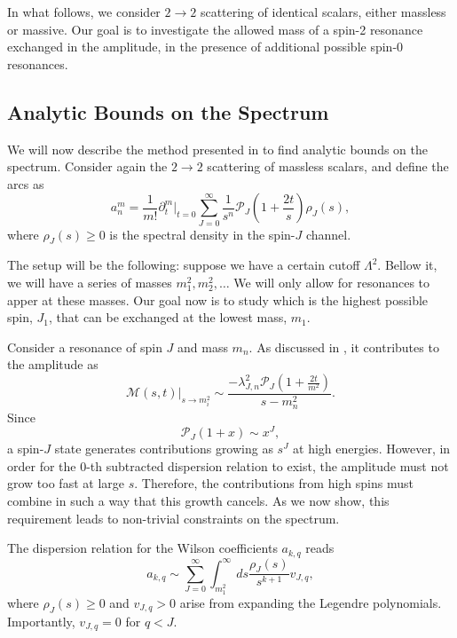 In what follows, we consider $2 \to 2$ scattering of identical scalars, either massless or massive. 
Our goal is to investigate the allowed mass of a spin-2 resonance exchanged in the amplitude, in the presence of additional possible spin-0 resonances. 

\subsection{Analytic Bounds on the Spectrum}

We will now describe the method presented in \autocite{Berman:2024kdh} to find analytic bounds on the spectrum. Consider again the $2 \to 2$ scattering of massless scalars, and define the arcs as 
\begin{equation}
    a_n^m = \frac{1}{m!} \partial_t^m \Big|_{t = 0} 
    \sum_{J=0}^{\infty} \frac{1}{s^n} 
    \mathcal{P}_J \left( 1 + \frac{2t}{s} \right) 
    \rho_J(s),
\end{equation}
where $\rho_J(s) \geq 0$ is the spectral density in the spin-$J$ channel. 

The setup will be the following: suppose we have a certain cutoff $\Lambda^2$. Bellow it, we will have a series of masses $m_1^2, m_2^2, \ldots$ We will only allow for resonances to apper at these masses. Our goal now is to study which is the highest possible spin, $J_1$, that can be exchanged at the lowest mass, $m_1$. 

Consider a resonance of spin $J$ and mass $m_n$. As discussed in , it contributes to the amplitude as 
\begin{equation}
     \mathcal{M}(s, t)|_{s \to m_i^2} \sim  
    \frac{ -  \lambda_{J,n}^2\mathcal{P}_J \left( 1 + \frac{2t}{m^2} \right)}{s - m_n^2} 
    .
\end{equation}
Since 
\begin{equation}
    \mathcal{P}_J(1 + x) \sim x^J,
\end{equation}
a spin-$J$ state generates contributions growing as $s^J$ at high energies. 
However, in order for the $0$-th subtracted dispersion relation to exist, the amplitude must not grow too fast at large $s$. Therefore, the contributions from high spins must combine in such a way that this growth cancels. As we now show, this requirement leads to non-trivial constraints on the spectrum.

The dispersion relation for the Wilson coefficients $a_{k,q}$ reads
\begin{equation}
    a_{k,q} \sim 
    \sum_{J=0}^{\infty} 
    \int_{m_1^2}^{\infty} ds 
    \frac{\rho_J(s)}{s^{k+1}} 
    v_{J,q},
\end{equation}
where $\rho_J(s) \geq 0$ and $v_{J,q} > 0$ arise from expanding the Legendre polynomials. 
Importantly, $v_{J,q} = 0$ for $q < J$.

